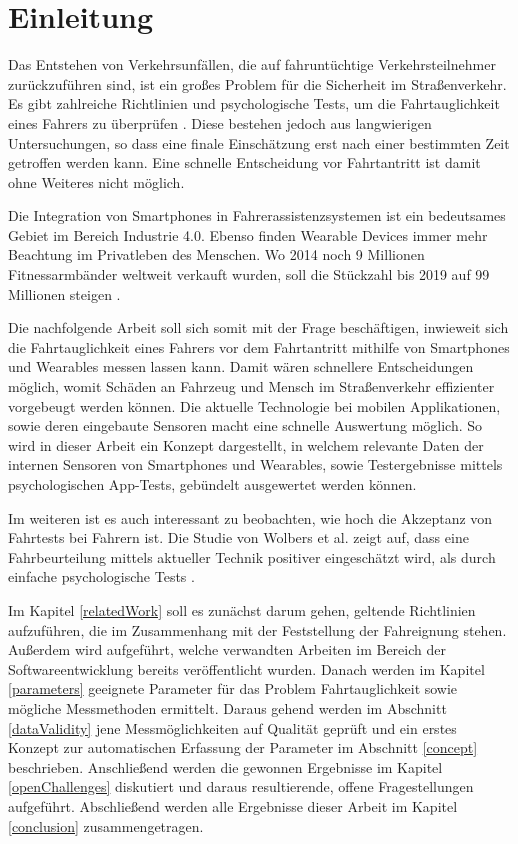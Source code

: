 \section{Einleitung}
\label{introduction}

Das Entstehen von Verkehrsunfällen, die auf fahruntüchtige Verkehrsteilnehmer zurückzuführen sind, ist ein großes Problem für die Sicherheit im Straßenverkehr. Es gibt zahlreiche Richtlinien und psychologische Tests, um die Fahrtauglichkeit eines Fahrers zu überprüfen \cite{drivervehiclelicencingagency,testverfahrenpsychometrischefahreignung,begutachtungsrichtlinien,beurteilungskriterien}. Diese bestehen jedoch aus langwierigen Untersuchungen, so dass eine finale Einschätzung erst nach einer bestimmten Zeit getroffen werden kann.  Eine schnelle Entscheidung vor Fahrtantritt ist damit ohne Weiteres nicht möglich.

Die Integration von Smartphones in Fahrerassistenzsystemen ist ein bedeutsames Gebiet im Bereich Industrie 4.0. Ebenso finden Wearable Devices immer mehr Beachtung im Privatleben des Menschen. Wo 2014 noch 9 Millionen Fitnessarmbänder weltweit verkauft wurden, soll die Stückzahl bis 2019 auf 99 Millionen steigen \cite{wearabletracking}. 

Die nachfolgende Arbeit soll sich somit mit der Frage beschäftigen, inwieweit sich die Fahrtauglichkeit eines Fahrers vor dem Fahrtantritt mithilfe von Smartphones und Wearables messen lassen kann. Damit wären schnellere Entscheidungen möglich, womit Schäden an Fahrzeug und Mensch im Straßenverkehr effizienter vorgebeugt werden können. Die aktuelle Technologie bei mobilen Applikationen, sowie deren eingebaute Sensoren macht eine schnelle Auswertung möglich. So wird in dieser Arbeit ein Konzept dargestellt, in welchem relevante Daten der internen Sensoren von Smartphones und Wearables, sowie Testergebnisse mittels psychologischen App-Tests, gebündelt ausgewertet werden können. 

Im weiteren ist es auch interessant zu beobachten, wie hoch die Akzeptanz von Fahrtests bei Fahrern ist. Die Studie von Wolbers et al. zeigt auf, dass eine Fahrbeurteilung mittels aktueller Technik positiver eingeschätzt wird, als durch einfache psychologische Tests \cite{interaktivefahrsimulation}.

Im Kapitel \ref{relatedWork} soll es zunächst darum gehen, geltende Richtlinien aufzuführen, die im Zusammenhang mit der Feststellung der Fahreignung stehen. Außerdem wird aufgeführt, welche verwandten Arbeiten im Bereich der Softwareentwicklung bereits veröffentlicht wurden. Danach werden im Kapitel \ref{parameters} geeignete Parameter für das Problem Fahrtauglichkeit sowie mögliche Messmethoden ermittelt. Daraus gehend werden im Abschnitt \ref{dataValidity} jene Messmöglichkeiten auf Qualität geprüft und ein erstes Konzept zur automatischen Erfassung der Parameter im Abschnitt \ref{concept} beschrieben. Anschließend werden die gewonnen Ergebnisse im Kapitel \ref{openChallenges} diskutiert und daraus resultierende, offene Fragestellungen aufgeführt. Abschließend werden alle Ergebnisse dieser Arbeit im Kapitel \ref{conclusion} zusammengetragen.